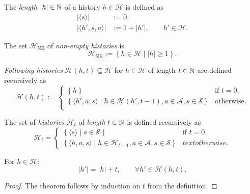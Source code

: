 \begin{definition} \label{def:hist-length}
The \emph{length} $|h|\in  \mathbb{N}$ of a history $h\in \mathcal{H}$ is defined as
\begin{align*}
|\langle s \rangle| &:= 0, \\
|\langle h', s, a \rangle| &:= 1 + |h'|, \qquad h' \in \mathcal{H}. 
\end{align*}
\end{definition}

\begin{definition} \label{def:hist-ne}
The set $\mathcal{H}_{\mathrm{NE}}$ of \emph{non-empty histories} is
\[
\mathcal{H}_{\mathrm{NE}} := \left\{ h \in \mathcal{H} \mid  |h| \ge 1 \right\}.
\]
 \leanok
\end{definition}

\begin{definition}\label{def:histories}
  \emph{Following histories} $\mathcal{H}(h,t) \subseteq \mathcal{H}$ for $h\in \mathcal{H}$ of length $t\in \mathbb{N}$ are defined recursively as
  \[
    \mathcal{H}(h,t) :=
    \begin{cases}
    \left\{  h \right\}  &\text{if } t = 0, \\
    \left\{  \langle h', a, s \rangle \mid h\in \mathcal{H}(h', t-1), a\in \mathcal{A}, s\in \mathcal{S}  \right\}  &\text{otherwise}. \\
    \end{cases}
  \]
\end{definition}

\begin{definition} \label{def:histories-horizon}
  The set of \emph{histories} $\mathcal{H}_{t}$ of \emph{length} $t \in \mathbb{N}$ is defined recursively as
  \[
    \mathcal{H}_t =
    \begin{cases}
      \left\{ \langle s \rangle \mid  s\in \mathcal{S} \right\} &\text{if } t = 0, \\
      \left\{ \langle h, a, s\rangle \mid h \in \mathcal{H}_{t-1}, a\in \mathcal{A}, s\in \mathcal{S} \right\} &text{otherwise}.
    \end{cases}
  \]
   \leanok
\end{definition}

\begin{theorem} \label{thm:hist-lenth-eq-horizon}
  For $h \in \mathcal{H}$:
  \[
   |h'| = |h| + t, \qquad \forall h'\in \mathcal{H}(h, t).
  \]
\end{theorem}
\begin{proof}
The theorem follows by induction on $t$ from the definition.  
\end{proof}

